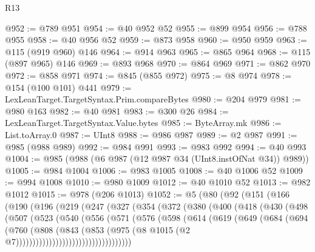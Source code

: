 \begin{lexlean}{R13}
\begin{coremodule}
@952 := @789 @951
@954 := @40 @952 @52
@955 := @899 @954
@956 := @788 @955
@958 := @40 @956 @52
@959 := @873 @958
@960 := @950 @959
@963 := @115 (@919 @960) @146
@964 := @914 @963
@965 := @865 @964
@968 := @115 (@897 @965) @146
@969 := @893 @968
@970 := @864 @969
@971 := @862 @970
@972 := @858 @971
@974 := @845 (@855 @972)
@975 := @8 @974
@978 := @154 (@100 @101) @441
@979 := LexLeanTarget.TargetSyntax.Prim.compareBytes
@980 := @204 @979
@981 := @980 @163
@982 := @40 @981
@983 := @300 @26
@984 := LexLeanTarget.TargetSyntax.Value.bytes
@985 := ByteArray.mk
@986 := List.toArray.{0}
@987 := UInt8
@988 := @986 @987
@989 := @2 @987
@991 := @985 (@988 @989)
@992 := @984 @991
@993 := @983 @992
@994 := @40 @993
@1004 := @985 (@988 (@6 @987 (@12 @987 @34 (UInt8.instOfNat @34)) @989))
@1005 := @984 @1004
@1006 := @983 @1005
@1008 := @40 @1006 @52
@1009 := @994 @1008
@1010 := @980 @1009
@1012 := @40 @1010 @52
@1013 := @982 @1012
@1015 := @978 (@206 @1013)
@1052 := @5
    (@80
      (@92
        (@151
          (@166
            (@190
              (@196
                (@219
                  (@247
                    (@327
                      (@354
                        (@372
                          (@380
                            (@400
                              (@418
                                (@430
                                  (@498
                                    (@507
                                      (@523
                                        (@540
                                          (@556
                                            (@571
                                              (@576
                                                (@598
                                                  (@614
                                                    (@619
                                                      (@649
                                                        (@684
                                                          (@694
                                                            (@760
                                                              (@808
                                                                (@843
                                                                  (@853
                                                                    (@975
                                                                      (@8
                                                                        @1015
                                                                        (@2
                                                                          @7)))))))))))))))))))))))))))))))))))

\end{coremodule}
\end{lexlean}
